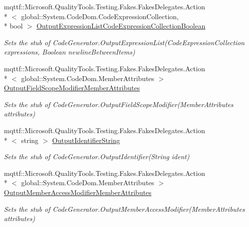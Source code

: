 \begin{DoxyCompactItemize}
mqttf\-::\-Microsoft.\-Quality\-Tools.\-Testing.\-Fakes.\-Fakes\-Delegates.\-Action\\*
$<$ global\-::\-System.\-Code\-Dom.\-Code\-Expression\-Collection, \\*
bool $>$ \hyperlink{class_system_1_1_code_dom_1_1_compiler_1_1_fakes_1_1_stub_code_compiler_ac6544de7a7a1dc95afb88369d70eadc9}{Output\-Expression\-List\-Code\-Expression\-Collection\-Boolean}
\begin{DoxyCompactList}\small\item\em Sets the stub of Code\-Generator.\-Output\-Expression\-List(\-Code\-Expression\-Collection expressions, Boolean newline\-Between\-Items)\end{DoxyCompactList}\item 
mqttf\-::\-Microsoft.\-Quality\-Tools.\-Testing.\-Fakes.\-Fakes\-Delegates.\-Action\\*
$<$ global\-::\-System.\-Code\-Dom.\-Member\-Attributes $>$ \hyperlink{class_system_1_1_code_dom_1_1_compiler_1_1_fakes_1_1_stub_code_compiler_a7d14b73a469bc16165628b22a42a3ea2}{Output\-Field\-Scope\-Modifier\-Member\-Attributes}
\begin{DoxyCompactList}\small\item\em Sets the stub of Code\-Generator.\-Output\-Field\-Scope\-Modifier(\-Member\-Attributes attributes)\end{DoxyCompactList}\item 
mqttf\-::\-Microsoft.\-Quality\-Tools.\-Testing.\-Fakes.\-Fakes\-Delegates.\-Action\\*
$<$ string $>$ \hyperlink{class_system_1_1_code_dom_1_1_compiler_1_1_fakes_1_1_stub_code_compiler_ad4e77cf5c7172b983c9c5b0387eec736}{Output\-Identifier\-String}
\begin{DoxyCompactList}\small\item\em Sets the stub of Code\-Generator.\-Output\-Identifier(\-String ident)\end{DoxyCompactList}\item 
mqttf\-::\-Microsoft.\-Quality\-Tools.\-Testing.\-Fakes.\-Fakes\-Delegates.\-Action\\*
$<$ global\-::\-System.\-Code\-Dom.\-Member\-Attributes $>$ \hyperlink{class_system_1_1_code_dom_1_1_compiler_1_1_fakes_1_1_stub_code_compiler_ae3a7d65f3d242c6d0d52b3707ce3661d}{Output\-Member\-Access\-Modifier\-Member\-Attributes}
\begin{DoxyCompactList}\small\item\em Sets the stub of Code\-Generator.\-Output\-Member\-Access\-Modifier(\-Member\-Attributes attributes)\end{DoxyCompactList}\item 

\end{DoxyCompactItemize}
